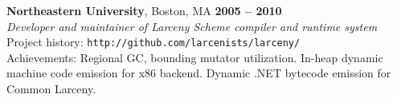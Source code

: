 \documentclass[margin,line,draft]{res}
\def\noneed#1{}
\begin{document}
\begin{resume}
    \textbf{Northeastern University}, Boston, MA \hfill \textbf{2005 -- 2010}\\\vspace{1mm}%
    \textsl{Developer and maintainer of Larceny Scheme compiler and runtime system} \\
    Project history: {\tt http://github.com/larcenists/larceny/}\\
    Achievements: Regional GC, bounding mutator utilization. In-heap dynamic machine code emission for x86 backend. Dynamic .NET bytecode emission for Common Larceny.
    \vspace{-2mm}
% 
% 
% 
% 
% 


\end{resume}
\end{document}
